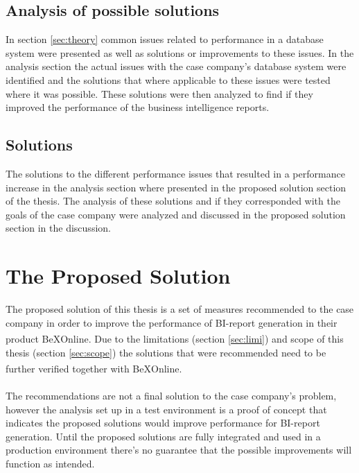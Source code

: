 \documentclass{cslthse-msc}
\newcommand{\bex}{BeX\textsuperscript{\textregistered}}
\begin{document}
\subsection{Analysis of possible solutions}
In section \ref{sec:theory} common issues related to performance in a database system were presented as well as solutions or improvements to these issues. In the analysis section the actual issues with the case company's database system were identified and the solutions that where applicable to these issues were tested where it was possible. These solutions were then analyzed to find if they improved the performance of the business intelligence reports.

\subsection{Solutions}
The solutions to the different performance issues that resulted in a performance increase in the analysis section where presented in the proposed solution section of the thesis. The analysis of these solutions and if they corresponded with the goals of the case company were analyzed and discussed in the proposed solution section in the discussion.

\section{The Proposed Solution}
The proposed solution of this thesis is a set of measures recommended to the case company in order to improve the performance of BI-report generation in their product \bex Online. Due to the limitations (section \ref{sec:limi}) and scope of this thesis (section \ref{sec:scope}) the solutions that were recommended need to be further verified together with \bex Online.\\\\
The recommendations are not a final solution to the case company's problem, however the analysis set up in a test environment is a proof of concept that indicates the proposed solutions would improve performance for BI-report generation. Until the proposed solutions are fully integrated and used in a production environment there's no guarantee that the possible improvements will function as intended.\\\\
\end{document}
